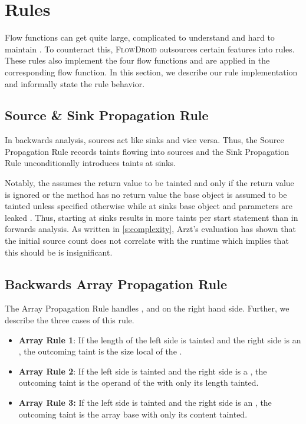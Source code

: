 \documentclass[../draft.tex]{subfiles}
\begin{document}
    \section{Rules}\label{s:rules}
    Flow functions can get quite large, complicated to understand and hard to maintain \cite{Lerch2015}. To counteract this, \textsc{FlowDroid} outsources certain features into rules. These rules also implement the four flow functions and are applied in the corresponding flow function.
    In this section, we describe our rule implementation and informally state the rule behavior.

    \subsection{Source \& Sink Propagation Rule}\label{s:sourcerule}
    In backwards analysis, sources act like sinks and vice versa. Thus, the Source Propagation Rule records taints flowing into sources and the Sink Propagation Rule unconditionally introduces taints at sinks.

    Notably, the  assumes the return value to be tainted and only if the return value is ignored or the method has no return value the base object is assumed to be tainted unless specified otherwise while at sinks base object and parameters are leaked \cite{Arzt2017PhD}. Thus, starting at sinks results in more taints per start statement than in forwards analysis. As written in \autoref{s:complexity}, Arzt's evaluation has shown that the initial source count does not correlate with the runtime which implies that this should be is insignificant.
    

    \subsection{Backwards Array Propagation Rule}
    The Array Propagation Rule handles ,  and  on the right hand side. Further, we describe the three cases of this rule.

    \begin{itemize}
        \item \textbf{Array Rule 1}: If the length of the left side is tainted and the right side is an , the outcoming taint is the size local of the .
        \item  \textbf{Array Rule 2}: If the left side is tainted and the right side is a , the outcoming taint is the operand of the  with only its length tainted.
        \item \textbf{Array Rule 3:} If the left side is tainted and the right side is an , the outcoming taint is the array base with only its content tainted.
    \end{itemize}
\end{document}
